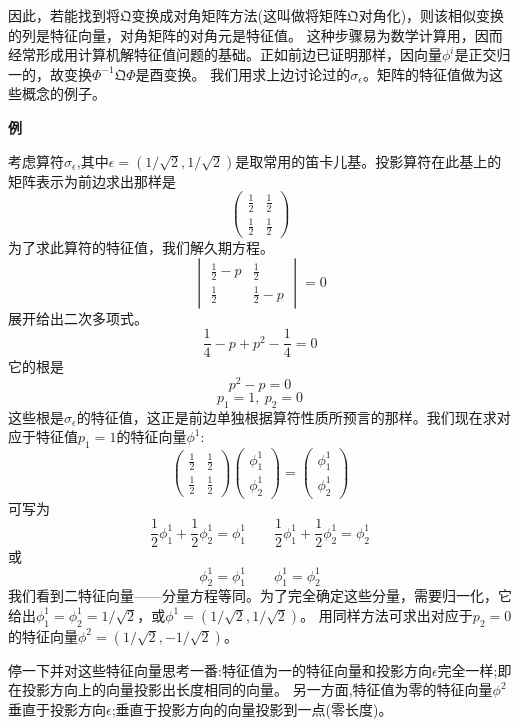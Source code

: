 因此，若能找到将$\mathfrak{Q}$变换成对角矩阵方法(这叫做将矩阵$\mathfrak{Q}$对角化)，则该相似变换的列是特征向量，对角矩阵的对角元是特征值。
这种步骤易为数学计算用，因而经常形成用计算机解特征值问题的基础。正如前边已证明那样，因向量$\phi^i$是正交归一的，故变换$\Phi^{-1}\mathfrak{Q}\Phi$是酉变换。
我们用求上边讨论过的$\sigma_{\epsilon}$。矩阵的特征值做为这些概念的例子。

\textbf{例}

考虑算符$\sigma_{\epsilon}$,其中$\epsilon=(1/\sqrt{2},1/\sqrt{2})$是取常用的笛卡儿基。投影算符在此基上的矩阵表示为前边求出那样是
\[
\begin{pmatrix}
    \frac{1}{2} & \frac{1}{2} \\ \frac{1}{2} & \frac{1}{2}
\end{pmatrix}    
\]
为了求此算符的特征值，我们解久期方程。
\[
\begin{vmatrix}
    \frac{1}{2}-p & \frac{1}{2} \\ \frac{1}{2} & \frac{1}{2}-p
\end{vmatrix}    
=0
\]
展开给出二次多项式。
\[\frac{1}{4}-p+p^2-\frac{1}{4}=0\]
它的根是
\[p^2-p=0\]
\[p_1=1, \ p_2=0\]
这些根是$\sigma_{\epsilon}$的特征值，这正是前边单独根据算符性质所预言的那样。我们现在求对应于特征值$p_1=1$的特征向量$\phi^1$:
\[
\begin{pmatrix}
    \frac{1}{2} & \frac{1}{2} \\ \frac{1}{2} & \frac{1}{2}
\end{pmatrix} 
\begin{pmatrix}
    \phi_1^1 \\ \phi_2^1
\end{pmatrix} 
= 
\begin{pmatrix}
    \phi_1^1 \\ \phi_2^1
\end{pmatrix}  
\]
可写为
\[\frac{1}{2}\phi_1^1+\frac{1}{2}\phi_2^1=\phi_1^1 \qquad \frac{1}{2}\phi_1^1+\frac{1}{2}\phi_2^1=\phi_2^1\]
或
\[\phi_2^1=\phi_1^1 \qquad \phi_1^1=\phi_2^1\]
我们看到二特征向量——分量方程等同。为了完全确定这些分量，需要归一化，它给出$\phi_1^1=\phi_2^1=1/\sqrt{2}$，或$\phi^1=(1/\sqrt{2},1/\sqrt{2})$。
用同样方法可求出对应于$p_2=0$的特征向量$\phi^2=(1/\sqrt{2},-1/\sqrt{2})$。

停一下并对这些特征向量思考一番:特征值为一的特征向量和投影方向$\epsilon$完全一样;即在投影方向上的向量投影出长度相同的向量。
另一方面,特征值为零的特征向量$\phi^2$垂直于投影方向$\epsilon$;垂直于投影方向的向量投影到一点(零长度)。

